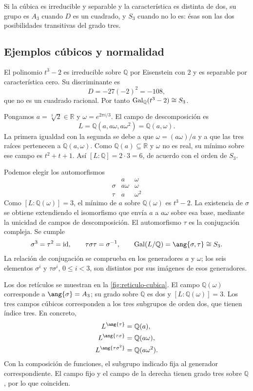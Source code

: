 Si la cúbica es irreducible y separable y la característica es distinta de dos, su grupo es $A_3$ cuando $D$ es un cuadrado, y $S_3$ cuando no lo es: ésas son las dos posibilidades transitivas del grado tres.

\subsection{Ejemplos cúbicos y normalidad}\label{tema:27-3-3}\label{tema:27-4-0b}
\begin{ejem}\label{ejem:C27-s3}
El polinomio $t^3-2$ es irreducible sobre $\mathbb Q$ por Eisenstein con $2$ y es separable por característica cero. Su discriminante es
\[
D=-27(-2)^2=-108,
\]
que no es un cuadrado racional. Por tanto $\operatorname{Gal}_{\mathbb Q}(t^3-2)\cong S_3$.

Pongamos $a=\sqrt[3]{2}\in\mathbb R$ y $\omega=e^{2\pi i/3}$. El campo de descomposición es
\[
L=\mathbb Q(a,a\omega,a\omega^2)=\mathbb Q(a,\omega).
\]
La primera igualdad con la segunda se debe a que $\omega=(a\omega)/a$ y a que las tres raíces pertenecen a $\mathbb Q(a,\omega)$. Como $\mathbb Q(a)\subseteq\mathbb R$ y $\omega$ no es real, su mínimo sobre ese campo es $t^2+t+1$. Así $[L:\mathbb Q]=2\cdot3=6$, de acuerdo con el orden de $S_3$.

Podemos elegir los automorfismos
\[
\begin{array}{c|cc}
&a&\omega\\\hline
\sigma&a\omega&\omega\\
\tau&a&\omega^2
\end{array}
\]
Como $[L:\mathbb Q(\omega)]=3$, el mínimo de $a$ sobre $\mathbb Q(\omega)$ es $t^3-2$. La existencia de $\sigma$ se obtiene extendiendo el isomorfismo que envía $a$ a $a\omega$ sobre esa base, mediante la unicidad de campos de descomposición. El automorfismo $\tau$ es la conjugación compleja. Se cumple
\[
\sigma^3=\tau^2=\id,\qquad \tau\sigma\tau=\sigma^{-1},
\qquad \gal(L/\mathbb Q)=\ang{\sigma,\tau}\cong S_3.
\]
La relación de conjugación se comprueba en los generadores $a$ y $\omega$; los seis elementos $\sigma^i$ y $\tau\sigma^i$, $0\leq i<3$, son distintos por sus imágenes de esos generadores.

Los dos retículos se muestran en la \cref{fig:reticulo-cubica}.
El campo $\mathbb Q(\omega)$ corresponde a $\ang{\sigma}=A_3$; su grado sobre $\mathbb Q$ es dos y $[L:\mathbb Q(\omega)]=3$. Los tres campos cúbicos corresponden a los tres subgrupos de orden dos, que tienen índice tres. En concreto,
\[
\begin{aligned}
L^{\ang{\tau}}&=\mathbb Q(a),\\
L^{\ang{\tau\sigma}}&=\mathbb Q(a\omega),\\
L^{\ang{\tau\sigma^2}}&=\mathbb Q(a\omega^2).
\end{aligned}
\]
Con la composición de funciones, el subgrupo indicado fija al generador correspondiente. El campo fijo y el campo de la derecha tienen grado tres sobre $\mathbb Q$, por lo que coinciden.


\end{ejem}
